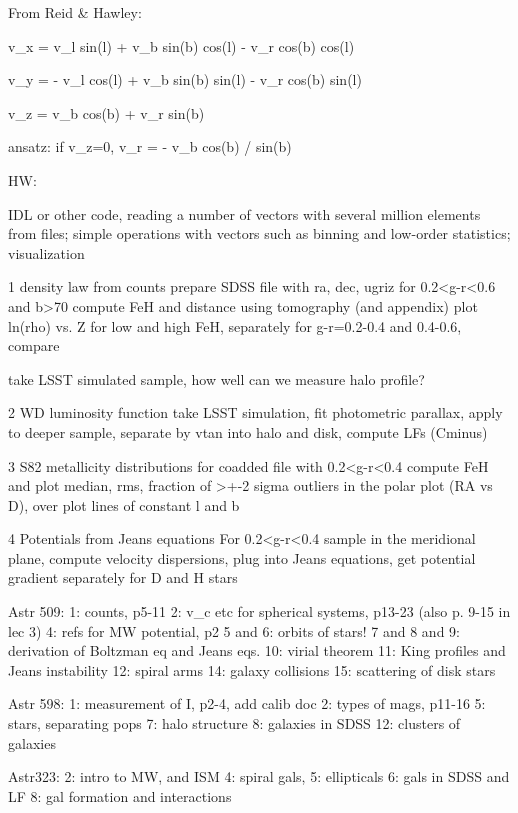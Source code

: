 From Reid \& Hawley:

  v_x =   v_l sin(l)  +  v_b sin(b) cos(l) - v_r cos(b) cos(l)

  v_y = - v_l cos(l)  +  v_b sin(b) sin(l) - v_r cos(b) sin(l)

  v_z =   v_b cos(b)  +  v_r sin(b) 

 ansatz: if v_z=0, v_r = - v_b cos(b) / sin(b)





    HW:



IDL or other code, reading a number of vectors with several
million elements from files; simple operations with vectors
such as binning and low-order statistics; visualization


1  density law from counts 
   prepare SDSS file with ra, dec, ugriz for 0.2<g-r<0.6 and b>70
   compute FeH and distance using tomography (and appendix)
   plot ln(rho) vs. Z for low and high FeH, separately for 
   g-r=0.2-0.4 and 0.4-0.6, compare 
   
   take LSST simulated sample, how well can we measure halo profile?

2  WD luminosity function
   take LSST simulation, fit photometric parallax, apply to deeper
   sample, separate by vtan into halo and disk, compute LFs (Cminus)

3  S82 metallicity distributions 
   for coadded file with 0.2<g-r<0.4 compute FeH and 
   plot median, rms, fraction of >+-2 sigma outliers
   in the polar plot (RA vs D), over plot lines of 
   constant l and b

4  Potentials from Jeans equations 
   For 0.2<g-r<0.4 sample in the meridional plane, 
   compute velocity dispersions, plug into Jeans equations,
   get potential gradient separately for D and H stars


Astr 509:
1: counts, p5-11 
2: v_c etc for spherical systems, p13-23 (also p. 9-15 in lec 3)
4: refs for MW potential, p2
5 and 6: orbits of stars!
7 and 8 and 9: derivation of Boltzman eq and Jeans eqs.
10: virial theorem
11: King profiles and Jeans instability
12: spiral arms
14: galaxy collisions
15: scattering of disk stars

Astr 598:
1: measurement of I, p2-4, add calib doc
2: types of mags, p11-16
5: stars, separating pops
7: halo structure
8: galaxies in SDSS
12: clusters of galaxies

Astr323:
2: intro to MW, and ISM
4: spiral gals, 5: ellipticals
6: gals in SDSS and LF
8: gal formation and interactions


